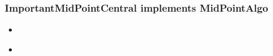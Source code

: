 	
	
	
	\subsubsection{ImportantMidPointCentral implements MidPointAlgo}
	
	
	\begin{itemize}
		\item 
		\begin{description}
			\item 
		\end{description}
	\end{itemize}
	\begin{itemize}
		\item 
		\begin{description}
			\item 
		\end{description}
	\end{itemize}
	
	\newpage
